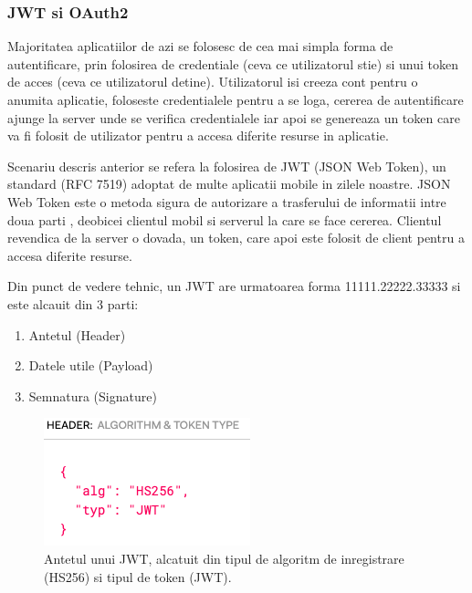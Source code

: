 \documentclass[a4paper]{article}
\begin{document}
\subsubsection{JWT si OAuth2}

Majoritatea aplicatiilor de azi se folosesc de cea mai simpla forma de autentificare,
prin folosirea de credentiale (ceva ce utilizatorul stie) si unui token de acces (ceva
ce utilizatorul detine). Utilizatorul isi creeza cont pentru o anumita aplicatie, foloseste
credentialele pentru a se loga, cererea de autentificare ajunge la server unde se verifica
credentialele iar apoi se genereaza un token care va fi folosit de utilizator pentru a accesa
diferite resurse in aplicatie.

Scenariu descris anterior se refera la folosirea de JWT (JSON Web Token), un standard (RFC 7519) \cite{rfc-7519} 
adoptat de multe aplicatii mobile in zilele noastre. 
JSON Web Token este o metoda sigura de autorizare a trasferului
de informatii intre doua parti \cite{jwt}, deobicei 
clientul mobil si serverul la care se face cererea. Clientul revendica de la server
o dovada, un token, care apoi este folosit de client pentru a accesa diferite 
resurse.

Din punct de vedere tehnic, un JWT are urmatoarea forma 11111.22222.33333 si este
alcauit din 3 parti:

\begin{enumerate}
    \item Antetul (Header)
    \item Datele utile (Payload)
    \item Semnatura (Signature)
\end{enumerate}


\begin{figure}[H]
    \begin{minipage}[c]{0.67\textwidth}
        \includegraphics[width=\textwidth]{jwt-header.png}
    \end{minipage}\hfill
    \begin{minipage}[c]{0.3\textwidth}
        \caption{Antetul unui JWT, alcatuit din tipul de algoritm 
        de inregistrare (HS256) si tipul de token (JWT).}
    \end{minipage}
\end{figure}
\end{document}
